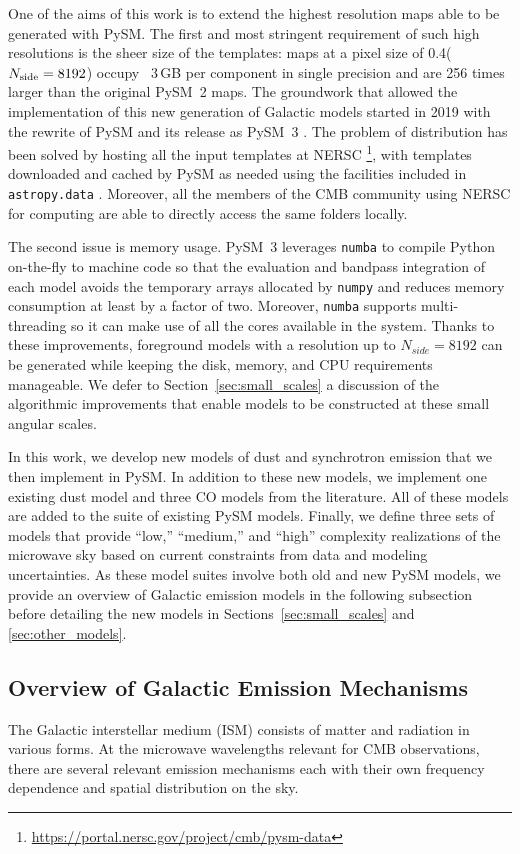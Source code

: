 \documentclass[twocolumn]{aastex631}
\begin{document}
One of the aims of this work is to extend the highest resolution maps able to be generated with PySM. The first and most stringent requirement of such high resolutions is the sheer size of the templates: maps at a pixel size of 0.4\arcmin ($N_{\rm side}=8192$) occupy ~3\,GB per component in single precision and are 256 times larger than the original PySM~2 maps. The groundwork that allowed the implementation of this new generation of Galactic models started in 2019 with the rewrite of PySM and its release as PySM~3 \citep[see][for details]{Zonca:2021}. The problem of distribution has been solved by hosting all the input templates at NERSC \footnote{\url{https://portal.nersc.gov/project/cmb/pysm-data}}, with templates downloaded and cached by PySM as needed using the facilities included in \texttt{astropy.data} \citep{AstropyCollaboration:2013, AstropyCollaboration:2018}. Moreover, all the members of the CMB community using NERSC for computing are able to directly access the same folders locally.

The second issue is memory usage. PySM~3 leverages \texttt{numba} \citep{Lam:2015} to compile Python on-the-fly to machine code so that the evaluation and bandpass integration of each model avoids the temporary arrays allocated by \texttt{numpy} and reduces memory consumption at least by a factor of two. Moreover, \texttt{numba} supports multi-threading so it can make use of all the cores available in the system. Thanks to these improvements, foreground models with a resolution up to $N_{side}=8192$ can be generated while keeping the disk, memory, and CPU requirements manageable. We defer to Section~\ref{sec:small_scales} a discussion of the algorithmic improvements that enable models to be constructed at these small angular scales.

In this work, we develop new models of dust and synchrotron emission that we then implement in PySM. In addition to these new models, we implement one existing dust model and three CO models from the literature. All of these models are added to the suite of existing PySM models. Finally, we define three sets of models that provide ``low,'' ``medium,'' and ``high'' complexity realizations of the microwave sky based on current constraints from data and modeling uncertainties. As these model suites involve both old and new PySM models, we provide an overview of Galactic emission models in the following subsection before detailing the new models in Sections~\ref{sec:small_scales} and \ref{sec:other_models}.

\subsection{Overview of Galactic Emission Mechanisms}
The Galactic interstellar medium (ISM) consists of matter and radiation in various forms. At the microwave wavelengths relevant for CMB observations, there are several relevant emission mechanisms each with their own frequency dependence and spatial distribution on the sky. 
\end{document}
